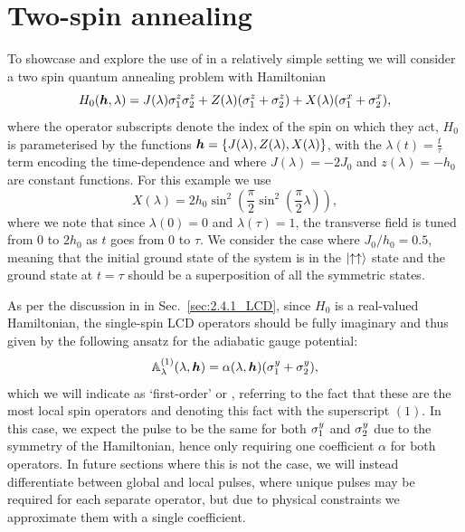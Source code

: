 \section{Two-spin annealing}\label{sec:5.1_2spin_annealing}

To showcase and explore the use of  in a relatively simple setting we will consider a two spin quantum annealing problem with Hamiltonian
\begin{equation}\label{eq:two_spin_hamiltonian}
H_0(\boldsymbol{h}, \lambda) = J(\lambda) \sigma^z_1 \sigma^z_2 + Z(\lambda) ( \sigma^z_{1} + \sigma^z_{2}) +  X(\lambda) (\sigma^x_{1} + \sigma^x_{2}),
\end{equation}
where the operator subscripts denote the index of the spin on which they act, $H_0$ is parameterised by the functions $\boldsymbol{h} = \{J(\lambda), Z(\lambda), X(\lambda)\}$, with the $\lambda(t) = \frac{t}{\tau}$ term encoding the time-dependence and where $J(\lambda) = -2J_0$ and $z(\lambda) = -h_0$ are constant functions. For this example we use
\begin{equation}\label{eq:lambda_func1}
X(\lambda) = 2 h_0 \sin^2\left(\frac{\pi}{2} \sin^2 \left( \frac{\pi}{2} \lambda \right) \right),
\end{equation}
where we note that since $\lambda(0) = 0$ and $\lambda(\tau) = 1$, the transverse field is tuned from $0$ to $2h_0$ as $t$ goes from $0$ to $\tau$. We consider the case where $J_0/h_0 = 0.5$, meaning that the initial ground state of the system is in the $\ket{\uparrow \uparrow}$ state and the ground state at $t = \tau$ should be a superposition of all the symmetric states.

As per the discussion in in Sec.~\ref{sec:2.4.1_LCD}, since $H_0$ is a real-valued Hamiltonian, the single-spin LCD operators should be fully imaginary and thus given by the following ansatz for the adiabatic gauge potential:
\begin{equation}\label{eq:LCD1st}
\mathbb{A}_{\lambda}^{(1)}(\lambda, \boldsymbol{h}) = \alpha(\lambda, \boldsymbol{h}) (\sigma^y_1 + \sigma^y_2),
\end{equation}
which we will indicate as `first-order' or  , referring to the fact that these are the most local spin operators and denoting this fact with the superscript $(1)$. In this case, we expect the  pulse to be the same for both $\sigma^y_1$ and $\sigma^y_2$ due to the symmetry of the Hamiltonian, hence only requiring one coefficient $\alpha$ for both operators. In future sections where this is not the case, we will instead differentiate between global and local  pulses, where unique pulses may be required for each separate operator, but due to physical constraints we approximate them with a single coefficient.

